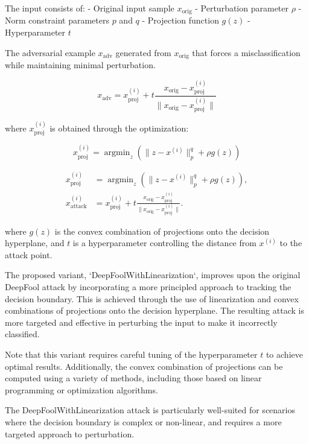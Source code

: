 The input consists of:
- Original input sample $x_{\text{orig}}$
- Perturbation parameter $\rho$
- Norm constraint parameters $p$ and $q$
- Projection function $g(z)$
- Hyperparameter $t$

The adversarial example $x_{\text{adv}}$ generated from $x_{\text{orig}}$ that forces a misclassification while maintaining minimal perturbation.

\[
x_{\text{adv}} = x^{(i)}_{\text{proj}} + t \frac{x_{\text{orig}} - x^{(i)}_{\text{proj}}}{\|x_{\text{orig}} - x^{(i)}_{\text{proj}}\|}
\]

where $x^{(i)}_{\text{proj}}$ is obtained through the optimization:

\[
x^{(i)}_{\text{proj}} = \mathop{\mathrm{argmin}}_{z} \left(\|z - x^{(i)}\|_p^q + \rho g(z)\right)
\]


\[
\begin{aligned}
x^{(i)}_{\text{proj}} &= \mathop{\mathrm{argmin}}_{z} \left(\|z - x^{(i)}\|_p^q + \rho g(z)\right), \\
x^{(i)}_{\text{attack}} &= x^{(i)}_{\text{proj}} + t \frac{x_{\text{orig}} - x^{(i)}_{\text{proj}}}{\|x_{\text{orig}} - x^{(i)}_{\text{proj}}\|}.
\end{aligned}
\]

where $g(z)$ is the convex combination of projections onto the decision hyperplane, and $t$ is a hyperparameter controlling the distance from $x^{(i)}$ to the attack point.

The proposed variant, `DeepFoolWithLinearization`, improves upon the original DeepFool attack by incorporating a more principled approach to tracking the decision boundary. This is achieved through the use of linearization and convex combinations of projections onto the decision hyperplane. The resulting attack is more targeted and effective in perturbing the input to make it incorrectly classified.

Note that this variant requires careful tuning of the hyperparameter $t$ to achieve optimal results. Additionally, the convex combination of projections can be computed using a variety of methods, including those based on linear programming or optimization algorithms.

The DeepFoolWithLinearization attack is particularly well-suited for scenarios where the decision boundary is complex or non-linear, and requires a more targeted approach to perturbation.